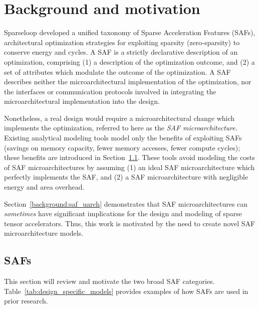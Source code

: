 \chapter{Background and motivation}
\label{chapter:background}

Sparseloop\cite{sparseloop} developed a unified taxonomy of Sparse Acceleration Features (SAFs), architectural optimization strategies for exploiting sparsity (zero-sparsity) to conserve energy and cycles. A SAF is a strictly declarative description of an optimization, comprising (1) a description of the optimization outcome, and (2) a set of attributes which modulate the outcome of the optimization. A SAF describes neither the microarchitectural implementation of the optimization, nor the interfaces or communication protocols involved in integrating the microarchitectural implementation into the design. 

Nonetheless, a real design would require a microarchitectural change which implements the optimization, referred to here as the \textit{SAF microarchitecture.} Existing analytical modeling tools\cite{sparseloop} model only the benefits of exploiting SAFs (savings on memory capacity, fewer memory accesses, fewer compute cycles); these benefits are introduced in Section~\ref{background:safs}. These tools avoid modeling the costs of SAF microarchitectures by assuming (1) an ideal SAF microarchitecture which perfectly implements the SAF, and (2) a SAF microarchitecture with negligible energy and area overhead.

Section~\ref{background:saf_uarch} demonstrates that SAF microarchitectures can \textit{sometimes} have significant implications for the design and modeling of sparse tensor accelerators. Thus, this work is motivated by the need to create novel SAF microarchitecture models.
%
%
\section{SAFs}
\label{background:safs}

This section will review and motivate the two broad SAF categories. Table~\ref{tab:design_specific_models} provides examples of how SAFs are used in prior research.

